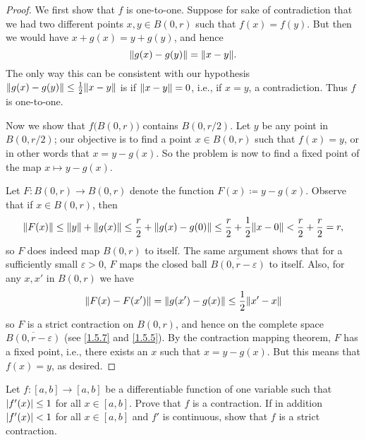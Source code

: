 \begin{proof}
  We first show that \(f\) is one-to-one.
  Suppose for sake of contradiction that we had two different points \(x, y \in B(0, r)\) such that \(f(x) = f(y)\).
  But then we would have \(x + g(x) = y + g(y)\), and hence
  \[
    \norm*{g(x) - g(y)} = \norm*{x - y}.
  \]
  The only way this can be consistent with our hypothesis \(\norm*{g(x) - g(y)} \leq \frac{1}{2} \norm*{x - y}\) is if \(\norm*{x - y} = 0\), i.e., if \(x = y\), a contradiction.
  Thus \(f\) is one-to-one.

  Now we show that \(f\big(B(0, r)\big)\) contains \(B(0, r / 2)\).
  Let \(y\) be any point in \(B(0, r / 2)\);
  our objective is to find a point \(x \in B(0, r)\) such that \(f(x) = y\), or in other words that \(x = y - g(x)\).
  So the problem is now to find a fixed point of the map \(x \mapsto y - g(x)\).

  Let \(F : B(0, r) \to B(0, r)\) denote the function \(F(x) \coloneqq y - g(x)\).
  Observe that if \(x \in B(0, r)\), then
  \[
    \norm*{F(x)} \leq \norm*{y} + \norm*{g(x)} \leq \frac{r}{2} + \norm*{g(x) - g(0)} \leq \frac{r}{2} + \frac{1}{2} \norm*{x - 0} < \frac{r}{2} + \frac{r}{2} = r,
  \]
  so \(F\) does indeed map \(B(0, r)\) to itself.
  The same argument shows that for a sufficiently small \(\varepsilon > 0\), \(F\) maps the closed ball \(\overline{B(0, r - \varepsilon)}\) to itself.
  Also, for any \(x, x'\) in \(B(0, r)\) we have
  \[
    \norm*{F(x) - F(x')} = \norm*{g(x') - g(x)} \leq \frac{1}{2} \norm*{x' - x}
  \]
  so \(F\) is a strict contraction on \(B(0, r)\), and hence on the complete space \(\overline{B(0, r - \varepsilon)}\) (see \cref{1.5.7} and \cref{1.5.5}).
  By the contraction mapping theorem, \(F\) has a fixed point, i.e., there exists an \(x\) such that \(x = y - g(x)\).
  But this means that \(f(x) = y\), as desired.
\end{proof}

\exercisesection

\begin{ex}\label{ex:6.6.1}
  Let \(f : [a, b] \to [a, b]\) be a differentiable function of one variable such that \(\abs{f'(x)} \leq 1\) for all \(x \in [a, b]\).
  Prove that \(f\) is a contraction.
  If in addition \(\abs{f'(x)} < 1\) for all \(x \in [a, b]\) and \(f'\) is continuous, show that \(f\) is a strict contraction.
\end{ex}

